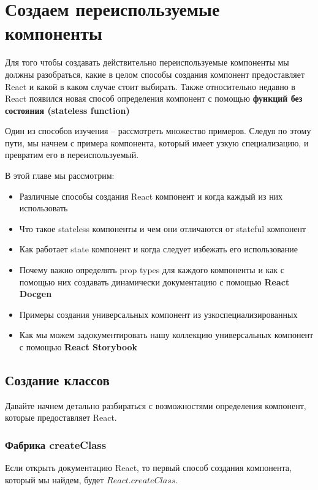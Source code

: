 \chapter{Создаем переиспользуемые компоненты}

Для того чтобы создавать действительно переиспользуемые компоненты мы должны разобраться, какие в целом способы создания компонент предоставляет React и какой в каком случае стоит выбирать. Также относительно недавно в React появился новая способ определения компонент с помощью \textbf{функций без состояния (stateless function)}

Один из способов изучения -- рассмотреть множество примеров. Следуя по этому пути, мы начнем с примера компонента, который имеет узкую специализацию, и превратим его в переиспользуемый.

В этой главе мы рассмотрим:

\begin{itemize}
  \item Различные способы создания React компонент и когда каждый из них использовать
  \item Что такое stateless компоненты и чем они отличаются от stateful компонент
  \item Как работает state компонент и когда следует избежать его использование
  \item Почему важно определять prop types для каждого компоненты и как с помощью них создавать динамически документацию с помощью \textbf{React Docgen}
  \item Примеры создания универсальных компонент из узкоспециализированных
  \item Как мы можем задокументировать нашу коллекцию универсальных компонент с помощью \textbf{React Storybook}
\end{itemize}


\section{Создание классов}

Давайте начнем детально разбираться с возможностями определения компонент, которые предоставляет React.

\subsection{Фабрика createClass}

Если открыть документацию React, то первый способ создания компонента, который мы найдем, будет $React.createClass$.

